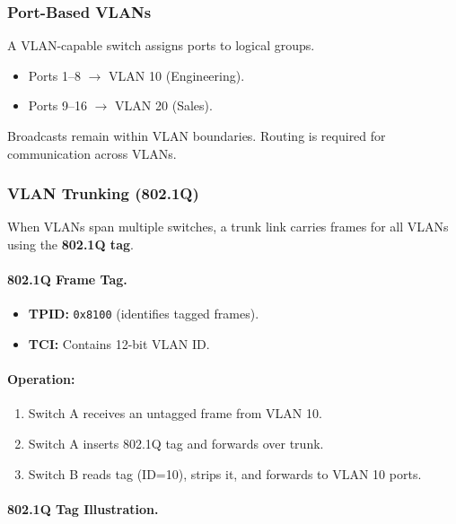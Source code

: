 \documentclass[12pt]{article}
\begin{document}
\subsubsection{Port-Based VLANs}

A VLAN-capable switch assigns ports to logical groups.

\begin{itemize}
    \item Ports 1--8 $\rightarrow$ VLAN 10 (Engineering).
    \item Ports 9--16 $\rightarrow$ VLAN 20 (Sales).
\end{itemize}

Broadcasts remain within VLAN boundaries.
Routing is required for communication across VLANs.

\subsubsection{VLAN Trunking (802.1Q)}

When VLANs span multiple switches, a trunk link carries frames for all VLANs using the \textbf{802.1Q tag}.

\paragraph{802.1Q Frame Tag.}

\begin{itemize}
    \item \textbf{TPID:} \texttt{0x8100} (identifies tagged frames).
    \item \textbf{TCI:} Contains 12-bit VLAN ID.
\end{itemize}

\paragraph{Operation:}
\begin{enumerate}
    \item Switch A receives an untagged frame from VLAN 10.
    \item Switch A inserts 802.1Q tag and forwards over trunk.
    \item Switch B reads tag (ID=10), strips it, and forwards to VLAN 10 ports.
\end{enumerate}

\paragraph{802.1Q Tag Illustration.}
\end{document}
